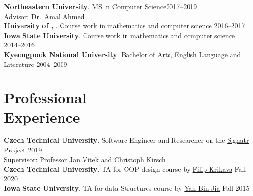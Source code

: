 \documentclass[margin,line]{resume}
\begin{document}
\begin{resume}
    \textbf{Northeastern University}. MS in Computer Science\hfill 2017--2019\\
    Advisor: \href{http://www.ccs.neu.edu/home/amal/}{Dr.~Amal Ahmed}\\[\mymedskip]
    \textbf{University of \Hawaii, \Manoa}. Course work in mathematics
    and computer science \hfill 2016--2017\\[\mymedskip]  %
    \textbf{Iowa State University}. Course work in mathematics and computer science \hfill 2014--2016\\[\mymedskip]
    \textbf{Kyeongpook National University}. Bachelor of Arts, English Language and Literature \hfill 2004--2009  %
    

    \section{\mysidestyle Professional\\Experience}
    \textbf{Czech Technical University}.  Software Engineer and Researcher on the \href{https://github.com/PRL-PRG/signatr}{Signatr Project} \hfill 2019--\\
    Supervisor: \href{http://janvitek.org/}{Professor Jan Vitek} and \href{http://cs.uni-salzburg.at/~ck/}{Christoph Kirsch}\\[\mysmallskip]
    \textbf{Czech Technical University}.  {\small TA} for {\small OOP} design course by \href{https://fikovnik.net/}{Filip Krikava} \hfill Fall 2020\\[\mysmallskip]
    \textbf{Iowa State University}.  {\small TA} for data Structures course by \href{http://web.cs.iastate.edu/~jia/}{Yan-Bin Jia} \hfill Fall 2015



\end{resume}
\end{document}
